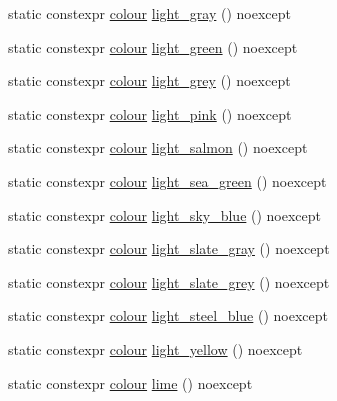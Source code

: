 \begin{DoxyCompactItemize}
\item 
static constexpr \mbox{\hyperlink{classmoka_1_1colour}{colour}} \mbox{\hyperlink{classmoka_1_1colour_a7ca64849f564ebb7f3b57d48c5559607}{light\+\_\+gray}} () noexcept
\item 
static constexpr \mbox{\hyperlink{classmoka_1_1colour}{colour}} \mbox{\hyperlink{classmoka_1_1colour_af776482fd76aeb8ab41587fd1ff11912}{light\+\_\+green}} () noexcept
\item 
static constexpr \mbox{\hyperlink{classmoka_1_1colour}{colour}} \mbox{\hyperlink{classmoka_1_1colour_a0b1fc6cd85e9d91c145fc43eac785b7c}{light\+\_\+grey}} () noexcept
\item 
static constexpr \mbox{\hyperlink{classmoka_1_1colour}{colour}} \mbox{\hyperlink{classmoka_1_1colour_a32ba9d7e567cdc58f25c1056ab059762}{light\+\_\+pink}} () noexcept
\item 
static constexpr \mbox{\hyperlink{classmoka_1_1colour}{colour}} \mbox{\hyperlink{classmoka_1_1colour_a8ef2d0e1678c2bff8471ea8777396d23}{light\+\_\+salmon}} () noexcept
\item 
static constexpr \mbox{\hyperlink{classmoka_1_1colour}{colour}} \mbox{\hyperlink{classmoka_1_1colour_a7b358ca1ba1208b73dd2c3d9846462eb}{light\+\_\+sea\+\_\+green}} () noexcept
\item 
static constexpr \mbox{\hyperlink{classmoka_1_1colour}{colour}} \mbox{\hyperlink{classmoka_1_1colour_a98d46f4acb076b3c8631de7ed28cd9ff}{light\+\_\+sky\+\_\+blue}} () noexcept
\item 
static constexpr \mbox{\hyperlink{classmoka_1_1colour}{colour}} \mbox{\hyperlink{classmoka_1_1colour_a4411364de773b18b5f7be4e0c493d815}{light\+\_\+slate\+\_\+gray}} () noexcept
\item 
static constexpr \mbox{\hyperlink{classmoka_1_1colour}{colour}} \mbox{\hyperlink{classmoka_1_1colour_ac1cbcc5b6e956fbfbeca6a625430c40e}{light\+\_\+slate\+\_\+grey}} () noexcept
\item 
static constexpr \mbox{\hyperlink{classmoka_1_1colour}{colour}} \mbox{\hyperlink{classmoka_1_1colour_a74d7ec0257e479a7255c31c23f820759}{light\+\_\+steel\+\_\+blue}} () noexcept
\item 
static constexpr \mbox{\hyperlink{classmoka_1_1colour}{colour}} \mbox{\hyperlink{classmoka_1_1colour_a1a9dea13046af27b7d1b43d9d4c5113d}{light\+\_\+yellow}} () noexcept
\item 
static constexpr \mbox{\hyperlink{classmoka_1_1colour}{colour}} \mbox{\hyperlink{classmoka_1_1colour_a7337e615ca2d82c820e1cb12dcbfafba}{lime}} () noexcept

\end{DoxyCompactItemize}
